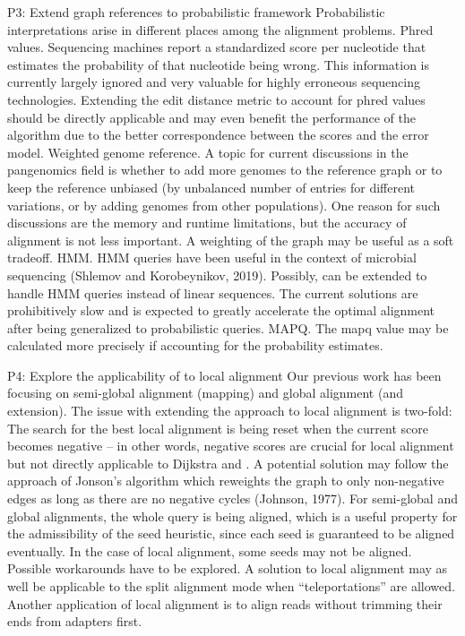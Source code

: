 P3: Extend graph references to probabilistic framework Probabilistic
interpretations arise in different places among the alignment problems. Phred
values. Sequencing machines report a standardized score per nucleotide that
estimates the probability of that nucleotide being wrong. This information is
currently largely ignored and very valuable for highly erroneous sequencing
technologies. Extending the edit distance metric to account for phred values
should be directly applicable and may even benefit the performance of the \A
algorithm due to the better correspondence between the scores and the error
model. Weighted genome reference. A topic for current discussions in the
pangenomics field is whether to add more genomes to the reference graph or to
keep the reference unbiased (by unbalanced number of entries for different
variations, or by adding genomes from other populations). One reason for such
discussions are the memory and runtime limitations, but the accuracy of
alignment is not less important. A weighting of the graph may be useful as a
soft tradeoff. HMM. HMM queries have been useful in the context of microbial
sequencing (Shlemov and Korobeynikov, 2019). Possibly, \A can be extended to
handle HMM queries instead of linear sequences. The current solutions are
prohibitively slow and \astarix is expected to greatly accelerate the optimal
alignment after being generalized to probabilistic queries. MAPQ. The mapq value
may be calculated more precisely if accounting for the probability estimates.

P4: Explore the applicability of \A to local alignment Our previous work has
been focusing on semi-global alignment (mapping) and global alignment (and
extension). The issue with extending the \A approach to local alignment is
two-fold: The search for the best local alignment is being reset when the
current score becomes negative – in other words, negative scores are crucial for
local alignment but not directly applicable to Dijkstra and \A. A potential
solution may follow the approach of Jonson’s algorithm which reweights the graph
to only non-negative edges as long as there are no negative cycles (Johnson,
1977). For semi-global and global alignments, the whole query is being aligned,
which is a useful property for the admissibility of the seed heuristic, since
each seed is guaranteed to be aligned eventually. In the case of local
alignment, some seeds may not be aligned. Possible workarounds have to be
explored. A solution to local alignment may as well be applicable to the split
alignment mode when “teleportations” are allowed. Another application of local
alignment is to align reads without trimming their ends from adapters first.

